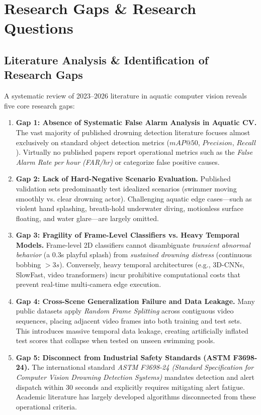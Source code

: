 \documentclass[a4paper,11pt]{article}
\begin{document}
\section{Research Gaps \& Research Questions}

\subsection{Literature Analysis \& Identification of Research Gaps}
A systematic review of 2023--2026 literature in aquatic computer vision reveals five core research gaps:

\begin{enumerate}
    \item \textbf{Gap 1: Absence of Systematic False Alarm Analysis in Aquatic CV.}
    The vast majority of published drowning detection literature focuses almost exclusively on standard object detection metrics ($mAP@50$, $Precision$, $Recall$). Virtually no published papers report operational metrics such as the \textit{False Alarm Rate per hour (FAR/hr)} or categorize false positive causes.
    
    \item \textbf{Gap 2: Lack of Hard-Negative Scenario Evaluation.}
    Published validation sets predominantly test idealized scenarios (swimmer moving smoothly vs. clear drowning actor). Challenging aquatic edge cases—such as violent hand splashing, breath-hold underwater diving, motionless surface floating, and water glare—are largely omitted.
    
    \item \textbf{Gap 3: Fragility of Frame-Level Classifiers vs. Heavy Temporal Models.}
    Frame-level 2D classifiers cannot disambiguate \textit{transient abnormal behavior} (a 0.3s playful splash) from \textit{sustained drowning distress} (continuous bobbing $>3s$). Conversely, heavy temporal architectures (e.g., 3D-CNNs, SlowFast, video transformers) incur prohibitive computational costs that prevent real-time multi-camera edge execution.
    
    \item \textbf{Gap 4: Cross-Scene Generalization Failure and Data Leakage.}
    Many public datasets apply \textit{Random Frame Splitting} across contiguous video sequences, placing adjacent video frames into both training and test sets. This introduces massive temporal data leakage, creating artificially inflated test scores that collapse when tested on unseen swimming pools.
    
    \item \textbf{Gap 5: Disconnect from Industrial Safety Standards (ASTM F3698-24).}
    The international standard \textit{ASTM F3698-24 (Standard Specification for Computer Vision Drowning Detection Systems)} mandates detection and alert dispatch within 30 seconds and explicitly requires mitigating alert fatigue. Academic literature has largely developed algorithms disconnected from these operational criteria.
\end{enumerate}
\end{document}
